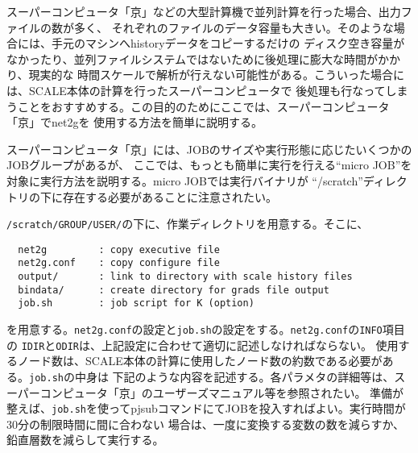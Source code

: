 スーパーコンピュータ「京」などの大型計算機で並列計算を行った場合、出力ファイルの数が多く、
それぞれのファイルのデータ容量も大きい。そのような場合には、手元のマシンへhistoryデータをコピーするだけの
ディスク空き容量がなかったり、並列ファイルシステムではないために後処理に膨大な時間がかかり、現実的な
時間スケールで解析が行えない可能性がある。こういった場合には、SCALE本体の計算を行ったスーパーコンピュータで
後処理も行なってしまうことをおすすめする。この目的のためにここでは、スーパーコンピュータ「京」でnet2gを
使用する方法を簡単に説明する。

スーパーコンピュータ「京」には、JOBのサイズや実行形態に応じたいくつかのJOBグループがあるが、
ここでは、もっとも簡単に実行を行える``micro JOB''を対象に実行方法を説明する。micro JOBでは実行バイナリが
``/scratch''ディレクトリの下に存在する必要があることに注意されたい。

\verb|/scratch/GROUP/USER/|の下に、作業ディレクトリを用意する。そこに、
\begin{verbatim}
  net2g         : copy executive file
  net2g.conf    : copy configure file
  output/       : link to directory with scale history files
  bindata/      : create directory for grads file output
  job.sh        : job script for K (option)
\end{verbatim}
を用意する。\verb|net2g.conf|の設定と\verb|job.sh|の設定をする。\verb|net2g.conf|の\verb|INFO|項目の
\verb|IDIR|と\verb|ODIR|は、上記設定に合わせて適切に記述しなければならない。
使用するノード数は、SCALE本体の計算に使用したノード数の約数である必要がある。\verb|job.sh|の中身は
下記のような内容を記述する。各パラメタの詳細等は、スーパーコンピュータ「京」のユーザーズマニュアル等を参照されたい。
準備が整えば、\verb|job.sh|を使ってpjsubコマンドにてJOBを投入すればよい。実行時間が30分の制限時間に間に合わない
場合は、一度に変換する変数の数を減らすか、鉛直層数を減らして実行する。\\

 \\
\\


